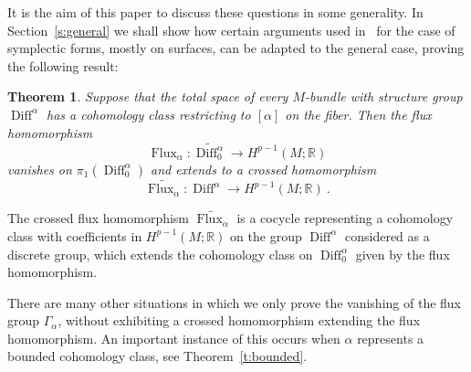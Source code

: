 \documentclass[12pt]{amsart}
\newtheorem{theorem}{Theorem}%
\theoremstyle{definition}
\theoremstyle{remark}
\def\bR{{\mathbb R}}
\newcommand\Flux{\operatorname{Flux}}
\newcommand\Diff{\operatorname{Diff}}
\begin{document}
It is the aim of this paper to discuss these questions in some generality. 
In Section~\ref{s:general} we shall show how certain arguments used in~\cite{KM} for the case of 
symplectic forms, mostly on surfaces, can be adapted to the general case, proving 
the following result:
\begin{theorem}\label{t:mainA}
    Suppose that the total space of every $M$-bundle with structure group $\Diff^{\alpha}$ has a 
    cohomology class restricting to $[\alpha]$ on the fiber. Then the flux homomorphism
    $$
    \Flux_{\alpha}\colon \widetilde{\Diff^{\alpha}_{0}}\longrightarrow H^{p-1}(M;\bR)
    $$ 
    vanishes on $\pi_{1}(\Diff^{\alpha}_{0})$ and extends to a crossed homomorphism 
    $$
    \widetilde{\Flux_{\alpha}}\colon \Diff^{\alpha}\longrightarrow H^{p-1}(M;\bR) \ .
    $$
    \end{theorem}
The crossed flux homomorphism $\widetilde{\Flux_{\alpha}}$ is a cocycle representing a cohomology 
class with coefficients in $H^{p-1}(M;\bR)$ on the group $\Diff^{\alpha}$ considered as a discrete group, 
which extends the cohomology class on $\Diff^{\alpha}_0$ given by the flux homomorphism. 

There are many other situations in which we only prove the vanishing of the flux group
$\Gamma_{\alpha}$, without exhibiting a crossed homomorphism extending the flux homomorphism.
An important instance of this occurs when $\alpha$ represents a bounded cohomology class, 
see Theorem~\ref{t:bounded}.
\end{document}
